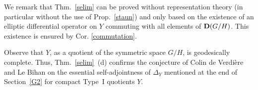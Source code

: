 \documentclass[10]{amsart}
\theoremstyle{remark}
\newtheorem{rem}[thm]{Remark}
\theoremstyle{definition}
\numberwithin{equation}{section}
\begin{document}
{%
%







%


We remark that Thm.~\ref{selim} can be proved without representation theory (in particular without the use of Prop.~\ref{staun}) and only based on the existence of an elliptic
differential operator on $Y$ commuting with all elements of ${\bf D}(G/H)$.  This existence is ensured by Cor. \ref{commutation}.

Observe that $Y$, as a quotient of the symmetric space $G/H$, is geodesically complete. Thus, Thm.~\ref{selim}~(d) confirms the conjecture of Colin de Verdi\`ere and Le Bihan on the essential self-adjointness of $\Delta_Y$ \cite{CL22} mentioned at the end of Section~\ref{G2} for compact Type~I quotients $Y$. 

}
\end{document}
